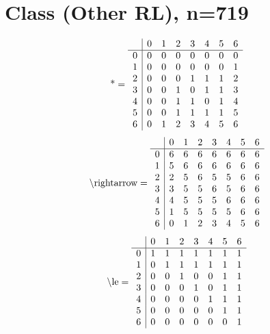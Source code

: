 \documentclass[11pt]{article}
\begin{document}
\section{Class (Other RL), n=719}
\[\text{*} = 
\begin{array}{r | r r r r r r r}
 & 0 & 1 & 2 & 3 & 4 & 5 & 6 \\ \hline
0 & 0 & 0 & 0 & 0 & 0 & 0 & 0 \\
1 & 0 & 0 & 0 & 0 & 0 & 0 & 1 \\
2 & 0 & 0 & 0 & 1 & 1 & 1 & 2 \\
3 & 0 & 0 & 1 & 0 & 1 & 1 & 3 \\
4 & 0 & 0 & 1 & 1 & 0 & 1 & 4 \\
5 & 0 & 0 & 1 & 1 & 1 & 1 & 5 \\
6 & 0 & 1 & 2 & 3 & 4 & 5 & 6 \\
\end{array}
\]
\[\text{\textbackslash rightarrow} = 
\begin{array}{r | r r r r r r r}
 & 0 & 1 & 2 & 3 & 4 & 5 & 6 \\ \hline
0 & 6 & 6 & 6 & 6 & 6 & 6 & 6 \\
1 & 5 & 6 & 6 & 6 & 6 & 6 & 6 \\
2 & 2 & 5 & 6 & 5 & 5 & 6 & 6 \\
3 & 3 & 5 & 5 & 6 & 5 & 6 & 6 \\
4 & 4 & 5 & 5 & 5 & 6 & 6 & 6 \\
5 & 1 & 5 & 5 & 5 & 5 & 6 & 6 \\
6 & 0 & 1 & 2 & 3 & 4 & 5 & 6 \\
\end{array}
\]
\[\text{\textbackslash le} = 
\begin{array}{r | r r r r r r r}
 & 0 & 1 & 2 & 3 & 4 & 5 & 6 \\ \hline
0 & 1 & 1 & 1 & 1 & 1 & 1 & 1 \\
1 & 0 & 1 & 1 & 1 & 1 & 1 & 1 \\
2 & 0 & 0 & 1 & 0 & 0 & 1 & 1 \\
3 & 0 & 0 & 0 & 1 & 0 & 1 & 1 \\
4 & 0 & 0 & 0 & 0 & 1 & 1 & 1 \\
5 & 0 & 0 & 0 & 0 & 0 & 1 & 1 \\
6 & 0 & 0 & 0 & 0 & 0 & 0 & 1 \\
\end{array}
\]
\end{document}
